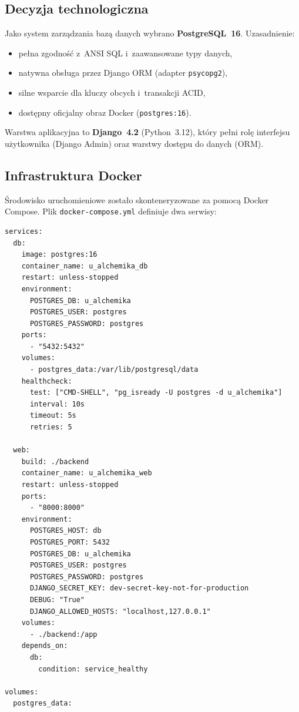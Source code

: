 \documentclass[12pt,a4paper]{article}
\begin{document}
\subsection{Decyzja technologiczna}

Jako system zarządzania bazą danych wybrano \textbf{PostgreSQL~16}. Uzasadnienie:

\begin{itemize}[nosep]
  \item pełna zgodność z~ANSI SQL i~zaawansowane typy danych,
  \item natywna obsługa przez Django ORM (adapter \texttt{psycopg2}),
  \item silne wsparcie dla kluczy obcych i~transakcji ACID,
  \item dostępny oficjalny obraz Docker (\texttt{postgres:16}).
\end{itemize}

Warstwa aplikacyjna to \textbf{Django~4.2} (Python~3.12), który pełni rolę
interfejsu użytkownika (Django Admin) oraz warstwy dostępu do danych (ORM).

\subsection{Infrastruktura Docker}

Środowisko uruchomieniowe zostało skonteneryzowane za pomocą Docker Compose.
Plik \texttt{docker-compose.yml} definiuje dwa serwisy:

\begin{lstlisting}[style=yamlstyle, caption={docker-compose.yml -- konfiguracja serwisów}]
services:
  db:
    image: postgres:16
    container_name: u_alchemika_db
    restart: unless-stopped
    environment:
      POSTGRES_DB: u_alchemika
      POSTGRES_USER: postgres
      POSTGRES_PASSWORD: postgres
    ports:
      - "5432:5432"
    volumes:
      - postgres_data:/var/lib/postgresql/data
    healthcheck:
      test: ["CMD-SHELL", "pg_isready -U postgres -d u_alchemika"]
      interval: 10s
      timeout: 5s
      retries: 5

  web:
    build: ./backend
    container_name: u_alchemika_web
    restart: unless-stopped
    ports:
      - "8000:8000"
    environment:
      POSTGRES_HOST: db
      POSTGRES_PORT: 5432
      POSTGRES_DB: u_alchemika
      POSTGRES_USER: postgres
      POSTGRES_PASSWORD: postgres
      DJANGO_SECRET_KEY: dev-secret-key-not-for-production
      DEBUG: "True"
      DJANGO_ALLOWED_HOSTS: "localhost,127.0.0.1"
    volumes:
      - ./backend:/app
    depends_on:
      db:
        condition: service_healthy

volumes:
  postgres_data:
\end{lstlisting}
\end{document}
